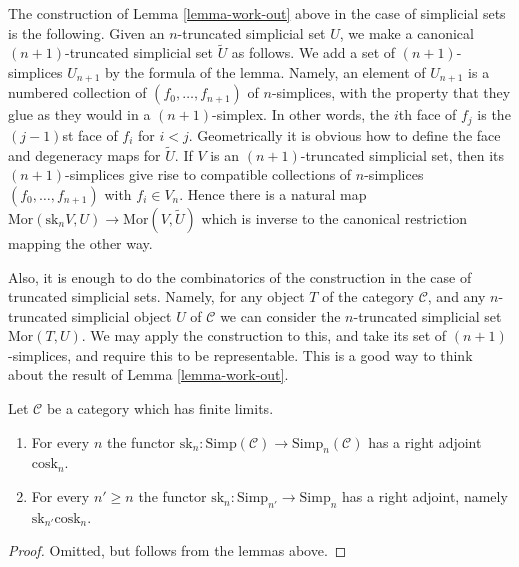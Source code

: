 \begin{remark}
\label{remark-cosk-simplicial-sets}
The construction of Lemma \ref{lemma-work-out}
above in the case of simplicial
sets is the following. Given an $n$-truncated simplicial
set $U$, we make a canonical $(n + 1)$-truncated simplicial
set $\tilde U$ as follows. We add a set of $(n + 1)$-simplices
$U_{n + 1}$ by the formula of the lemma. Namely,
an element of $U_{n + 1}$ is a numbered collection of
$(f_0,\ldots,f_{n + 1})$ of $n$-simplices,
with the property that they glue
as they would in a $(n + 1)$-simplex. In other words,
the $i$th face of $f_j$ is the $(j-1)$st face of $f_i$
for $i < j$. Geometrically it is obvious how to define the
face and degeneracy maps for $\tilde U$.
If $V$ is an $(n + 1)$-truncated simplicial set,
then its $(n + 1)$-simplices give rise to compatible collections
of $n$-simplices $(f_0, \ldots, f_{n + 1})$ with $f_i \in V_n$.
Hence there is a natural map
$\text{Mor}(\text{sk}_nV, U) \to \text{Mor}(V, \tilde U)$
which is inverse to the canonical restriction mapping
the other way.

\medskip\noindent
Also, it is enough to do the combinatorics of the
construction in the case of truncated simplicial sets.
Namely, for any object $T$ of the category $\mathcal{C}$,
and any $n$-truncated simplicial object $U$ of $\mathcal{C}$
we can consider the $n$-truncated simplicial set
$\text{Mor}(T, U)$. We may apply the construction to this,
and take its set of $(n + 1)$-simplices, and require this to be
representable. This is a good way to think about
the result of Lemma \ref{lemma-work-out}.
\end{remark}

\begin{lemma}
\label{lemma-cosk-up}
Let $\mathcal{C}$ be a category which has finite limits.
\begin{enumerate}
\item For every $n$ the functor $\text{sk}_n : \text{Simp}(\mathcal{C})
\to \text{Simp}_n(\mathcal{C})$ has a right adjoint $\text{cosk}_n$.
\item For every $n' \geq n$ the functor
$\text{sk}_n : \text{Simp}_{n'} \to \text{Simp}_n$
has a right adjoint, namely $\text{sk}_{n'}\text{cosk}_n$.
\end{enumerate}
\end{lemma}

\begin{proof}
Omitted, but follows from the lemmas above.
\end{proof}

